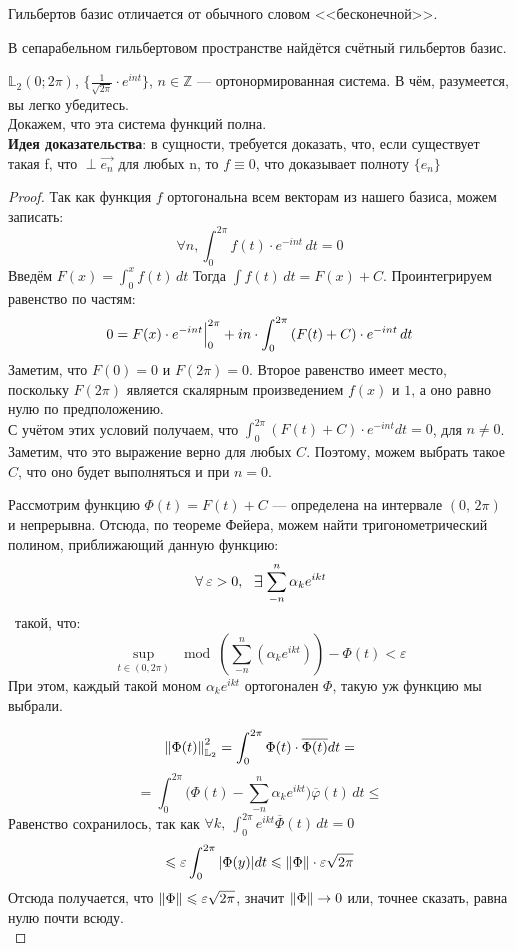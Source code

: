 \documentclass[12pt]{article}
\begin{document}
		{\color{gray} Гильбертов базис отличается от обычного словом <<бесконечной>>.}
	
		\begin{state}
			В сепарабельном гильбертовом пространстве найдётся счётный гильбертов базис.
		\end{state}
	
		\example $\mathbb{L}_2 (0; 2\pi)$, $\{ \frac{1}{\sqrt{2\pi}} \cdot e^{int} \}$, $n \in \mathbb{Z}$ --- ортонормированная система.
		{\color{gray} В чём, разумеется, вы легко убедитесь.}\\
		Докажем, что эта система функций полна.\\
		\textbf{Идея доказательства}: в сущности, требуется доказать, что, если существует такая f, что $\perp \vec{e_n}$
		для любых n, то $f \equiv 0$, что доказывает полноту $\{ e_n \}$
		\begin{proof}
			Так как функция $f$ ортогональна всем векторам из нашего базиса, можем записать:
			$$ \forall n, \int_0^{2\pi} f(t) \cdot e^{-int} \,dt = 0 $$
			Введём $F(x) = \int_0^x f(t) \,dt$ Тогда $\int f(t) \,dt = F(x) + C$. Проинтегрируем равенство по частям:
			$$ 0 = F(x) \cdot e^{-int} \Big|_{0}^{2\pi} 
			   + i n \cdot \int_0^{2\pi} \left(F(t) + C\right) \cdot e^{-int} \,dt $$
			Заметим, что $F(0) = 0$ и $F(2\pi) = 0$. Второе равенство имеет место, поскольку $F(2\pi)$ является 
		    скалярным произведением $f(x)$ и $1$, а оно равно нулю по предположению. \\
			С учётом этих условий получаем, что $\int_0^{2\pi} (F(t) + C) \cdot e^{-int} dt = 0$, для $n \neq 0$. 
			Заметим, что это выражение верно для любых $C$. Поэтому, можем выбрать такое $C$, что оно будет
			выполняться и при $n = 0$.
		
			Рассмотрим функцию $\Phi(t) = F(t) + C$ --- определена на интервале $(0,\, 2\pi)$ и непрерывна.
			Отсюда, по теореме Фейера, можем найти тригонометрический полином, приближающий данную функцию:
			$$\forall \varepsilon > 0,\, \:\Exists\! \sum_{-n}^n \alpha_k e^{ikt}$$\
			такой, что:
			$$ \underset{t \in (0,2\pi)}{\sup} \mod{(\sum_{-n}^n (\alpha_k e^{ikt})) - \Phi(t)} < \varepsilon $$
			При этом, каждый такой моном $\alpha_k e^{ikt}$ ортогонален $\Phi$, такую уж функцию мы выбрали.
		
			$$ \left\| \Phi(t) \right\|^2_{\mathbb{L}_2} = \int_0^{2\pi} \Phi(t) \cdot \overline{\Phi(t)} dt = $$
			$$ = \int_0^{2\pi}\Big(\Phi(t) - \sum_{-n}^n \alpha_k e^{ikt}\Big)\overline{\varphi}(t) \,dt \leq $$
			Равенство сохранилось, так как $\forall k,\: \int_0^{2\pi}e^{ikt}\overline{\Phi}(t) \,dt = 0$
			$$ \leqslant \varepsilon \int_0^{2\pi} | \Phi(y) | dt \leqslant \left\| \Phi \right\| \cdot \varepsilon\sqrt{2\pi} $$
			Отсюда получается, что $\left\| \Phi \right\| \leqslant \varepsilon \sqrt{2\pi}$, значит $\left\| \Phi \right\| \rightarrow 0$ или, точнее сказать,
			равна нулю почти всюду.\\
		\end{proof}
	
\end{document}
